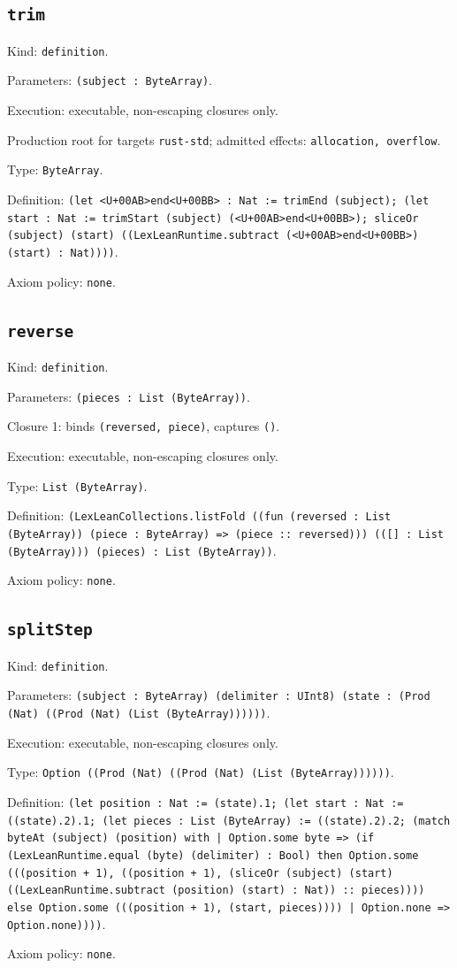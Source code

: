 \documentclass[11pt]{article}
\begin{document}
\subsection*{\texttt{trim}}
\noindent Kind: \texttt{definition}.\par
\noindent Parameters: \texttt{(subject : ByteArray)}.\par
\noindent Execution: executable, non-escaping closures only.\par
\noindent Production root for targets \texttt{rust-std}; admitted effects: \texttt{allocation, overflow}.\par
\noindent Type: \texttt{ByteArray}.\par
\noindent Definition: \texttt{(let <U+00AB>end<U+00BB> : Nat := trimEnd (subject); (let start : Nat := trimStart (subject) (<U+00AB>end<U+00BB>); sliceOr (subject) (start) ((LexLeanRuntime.subtract (<U+00AB>end<U+00BB>) (start) : Nat))))}.\par
\noindent Axiom policy: \texttt{none}.\par
\subsection*{\texttt{reverse}}
\noindent Kind: \texttt{definition}.\par
\noindent Parameters: \texttt{(pieces : List (ByteArray))}.\par
\noindent Closure 1: binds \texttt{(reversed, piece)}, captures \texttt{()}.\par
\noindent Execution: executable, non-escaping closures only.\par
\noindent Type: \texttt{List (ByteArray)}.\par
\noindent Definition: \texttt{(LexLeanCollections.listFold ((fun (reversed : List (ByteArray)) (piece : ByteArray) => (piece :: reversed))) (([] : List (ByteArray))) (pieces) : List (ByteArray))}.\par
\noindent Axiom policy: \texttt{none}.\par
\subsection*{\texttt{splitStep}}
\noindent Kind: \texttt{definition}.\par
\noindent Parameters: \texttt{(subject : ByteArray) (delimiter : UInt8) (state : (Prod (Nat) ((Prod (Nat) (List (ByteArray))))))}.\par
\noindent Execution: executable, non-escaping closures only.\par
\noindent Type: \texttt{Option ((Prod (Nat) ((Prod (Nat) (List (ByteArray))))))}.\par
\noindent Definition: \texttt{(let position : Nat := (state).1; (let start : Nat := ((state).2).1; (let pieces : List (ByteArray) := ((state).2).2; (match byteAt (subject) (position) with | Option.some byte => (if (LexLeanRuntime.equal (byte) (delimiter) : Bool) then Option.some (((position + 1), ((position + 1), (sliceOr (subject) (start) ((LexLeanRuntime.subtract (position) (start) : Nat)) :: pieces)))) else Option.some (((position + 1), (start, pieces)))) | Option.none => Option.none))))}.\par
\noindent Axiom policy: \texttt{none}.\par
\end{document}
